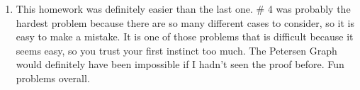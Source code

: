 \documentclass[12pt]{article}
\begin{document}
\begin{enumerate}[leftmargin=0cm,itemindent=.5cm,labelwidth=\itemindent,labelsep=0cm,align=left]
\begin{proof}
\end{proof}

\item This homework was definitely easier than the last one.  \# 4 was probably the hardest problem because there are so many different cases to consider, so it is easy to make a mistake.  It is one of those problems that is difficult because it seems easy, so you trust your first instinct too much.  The Petersen Graph would definitely have been impossible if I hadn't seen the proof before.  Fun problems overall.

\end{enumerate}
\end{document}
